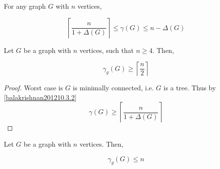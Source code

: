 \begin{theorem} [Balakrishnan 2012 10.3.2] \label{balakrishnan201210.3.2}
    For any graph $G$ with $n$ vertices, 
    
    \[ \left\lceil {\frac{n}{1+\Delta(G)}} \right\rceil \leq \gamma(G) \leq n - \Delta(G)\]    \cite{balakrishnan2012}
    
\end{theorem}

\begin{theorem} \label{minDomSize}
    Let $G$ be a graph with $n$ vertices, such that $n \geq 4$. Then,
    
    \[ \gamma_g(G) \geq \left \lceil{\frac{n}{2}}\right \rceil \]
    
\end{theorem}

\begin{proof}
Worst case is $G$ is minimally connected, i.e. $G$ is a tree. Thus by \ref{balakrishnan201210.3.2} 
\[\gamma(G) \geq \left\lceil {\frac{n}{1+\Delta(G)}} \right\rceil\]       
\end{proof}

\begin{theorem}
    Let $G$ be a graph with $n$ vertices. Then,
    
    \[ \gamma_g(G) \leq n\]
\end{theorem}
